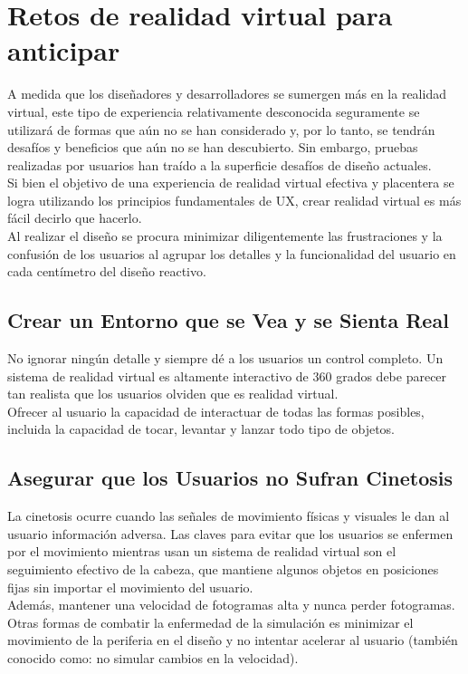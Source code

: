 \section{Retos de realidad virtual para anticipar}
A medida que los diseñadores y desarrolladores se sumergen más en la realidad virtual, este tipo de experiencia relativamente desconocida seguramente se utilizará de formas que 
aún no se han considerado y, por lo tanto, se tendrán desafíos y beneficios que aún no se han descubierto. Sin embargo, pruebas realizadas por usuarios\cite{wen19} han traído a la 
superficie desafíos de diseño actuales.\\
Si bien el objetivo de una experiencia de realidad virtual efectiva y placentera se logra utilizando los principios fundamentales de UX, crear realidad virtual es más fácil 
decirlo que hacerlo.\\
Al realizar el diseño se procura minimizar diligentemente las frustraciones y la confusión de los usuarios al agrupar los detalles y la funcionalidad del usuario en cada 
centímetro del diseño reactivo.

\subsection{Crear un Entorno que se Vea y se Sienta Real}
No ignorar ningún detalle y siempre dé a los usuarios un control completo. Un sistema de realidad virtual es altamente interactivo de 360 grados debe parecer tan realista que los 
usuarios olviden que es realidad virtual. \\
Ofrecer al usuario la capacidad de interactuar de todas las formas posibles, incluida la capacidad de tocar, levantar y lanzar todo tipo de objetos.

\subsection{Asegurar que los Usuarios no Sufran Cinetosis}
La cinetosis ocurre cuando las señales de movimiento físicas y visuales le dan al usuario información adversa. Las claves para evitar que los usuarios se enfermen por el movimiento 
mientras usan un sistema de realidad virtual son el seguimiento efectivo de la cabeza, que mantiene algunos objetos en posiciones fijas sin importar el movimiento del usuario.\\
Además, mantener una velocidad de fotogramas alta y nunca perder fotogramas. Otras formas de combatir la enfermedad de la simulación es minimizar el movimiento de la periferia 
en el diseño y no intentar acelerar al usuario (también conocido como: no simular cambios en la velocidad).

